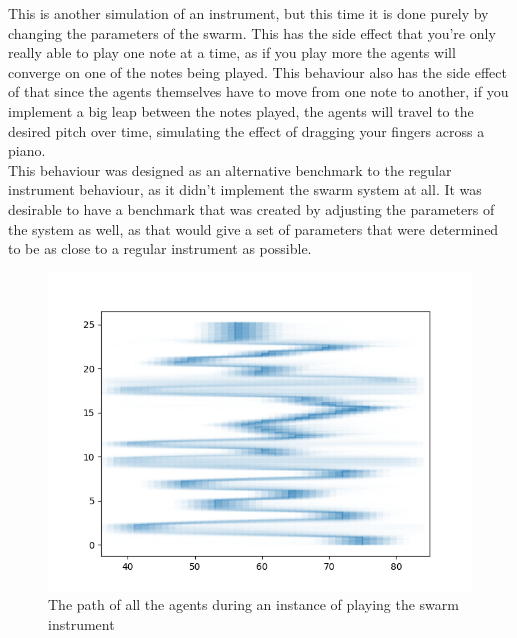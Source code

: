 \documentclass[a4paper,english]{report}
\begin{document}
	This is another simulation of an instrument, but this time it is done purely by changing the parameters of the swarm. This has the side effect that you're only really able to play one note at a time, as if you play more the agents will converge on one of the notes being played. This behaviour also has the side effect of that since the agents themselves have to move from one note to another, if you implement a big leap between the notes played, the agents will travel to the desired pitch over time, simulating the effect of dragging your fingers across a piano.\\
	This behaviour was designed as an alternative benchmark to the regular instrument behaviour, as it didn't implement the swarm system at all. It was desirable to have a benchmark that was created by adjusting the parameters of the system as well, as that would give a set of parameters that were determined to be as close to a regular instrument as possible.\\
	\begin{figure}
		\centering
		\includegraphics[width=1\linewidth]{swarminstrument}
		\caption{The path of all the agents during an instance of playing the swarm instrument}
		\label{fig:swarm}
	\end{figure}
\end{document}
